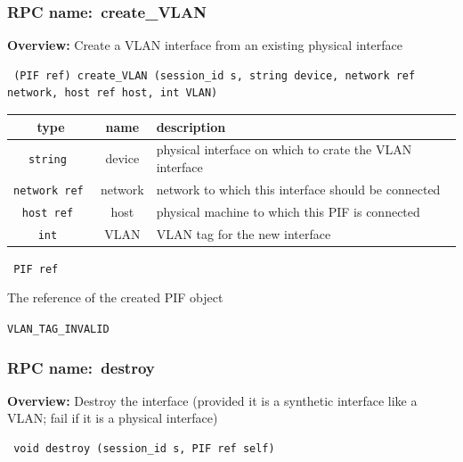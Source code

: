 \subsubsection{RPC name:~create\_VLAN}

{\bf Overview:} 
Create a VLAN interface from an existing physical interface

\begin{verbatim} (PIF ref) create_VLAN (session_id s, string device, network ref network, host ref host, int VLAN)\end{verbatim}



 
\vspace{0.3cm}
\begin{tabular}{|c|c|p{7cm}|}
 \hline
{\bf type} & {\bf name} & {\bf description} \\ \hline
{\tt string } & device & physical interface on which to crate the VLAN interface \\ \hline 

{\tt network ref } & network & network to which this interface should be connected \\ \hline 

{\tt host ref } & host & physical machine to which this PIF is connected \\ \hline 

{\tt int } & VLAN & VLAN tag for the new interface \\ \hline 

\end{tabular}

\vspace{0.3cm}

{\tt 
PIF ref
}


The reference of the created PIF object
\vspace{0.3cm}

 {\tt VLAN\_TAG\_INVALID}

\vspace{0.6cm}
\subsubsection{RPC name:~destroy}

{\bf Overview:} 
Destroy the interface (provided it is a synthetic interface like a VLAN; fail if it is a physical interface)

\begin{verbatim} void destroy (session_id s, PIF ref self)\end{verbatim}


